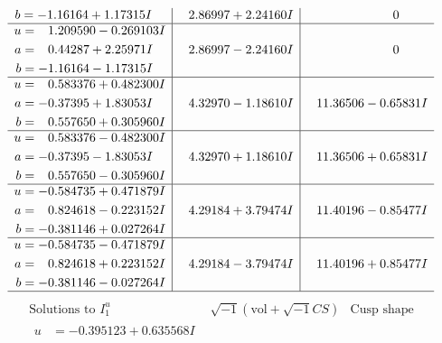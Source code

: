 \documentclass[1p]{elsarticle_modified}
\theoremstyle{definition}
\newcommand{\I}{\sqrt{-1}}
\begin{document}
$$\begin{array}{c|c|c}
\begin{aligned}
b &= -1.16164 + 1.17315 I\end{aligned}
 & \phantom{-}2.86997 + 2.24160 I & \phantom{-0.000000 } 0 \\ \hline\begin{aligned}
u &= \phantom{-}1.209590 - 0.269103 I \\
a &= \phantom{-}0.44287 + 2.25971 I \\
b &= -1.16164 - 1.17315 I\end{aligned}
 & \phantom{-}2.86997 - 2.24160 I & \phantom{-0.000000 } 0 \\ \hline\begin{aligned}
u &= \phantom{-}0.583376 + 0.482300 I \\
a &= -0.37395 + 1.83053 I \\
b &= \phantom{-}0.557650 + 0.305960 I\end{aligned}
 & \phantom{-}4.32970 - 1.18610 I & \phantom{-}11.36506 - 0.65831 I \\ \hline\begin{aligned}
u &= \phantom{-}0.583376 - 0.482300 I \\
a &= -0.37395 - 1.83053 I \\
b &= \phantom{-}0.557650 - 0.305960 I\end{aligned}
 & \phantom{-}4.32970 + 1.18610 I & \phantom{-}11.36506 + 0.65831 I \\ \hline\begin{aligned}
u &= -0.584735 + 0.471879 I \\
a &= \phantom{-}0.824618 - 0.223152 I \\
b &= -0.381146 + 0.027264 I\end{aligned}
 & \phantom{-}4.29184 + 3.79474 I & \phantom{-}11.40196 - 0.85477 I \\ \hline\begin{aligned}
u &= -0.584735 - 0.471879 I \\
a &= \phantom{-}0.824618 + 0.223152 I \\
b &= -0.381146 - 0.027264 I\end{aligned}
 & \phantom{-}4.29184 - 3.79474 I & \phantom{-}11.40196 + 0.85477 I\\
 \hline 
 \end{array}$$\newpage$$\begin{array}{c|c|c}  
\text{Solutions to }I^u_{1}& \I (\text{vol} + \sqrt{-1}CS) & \text{Cusp shape}\\
 \hline 
\begin{aligned}
u &= -0.395123 + 0.635568 I \\

\end{aligned}
\end{array}$$
\end{document}
